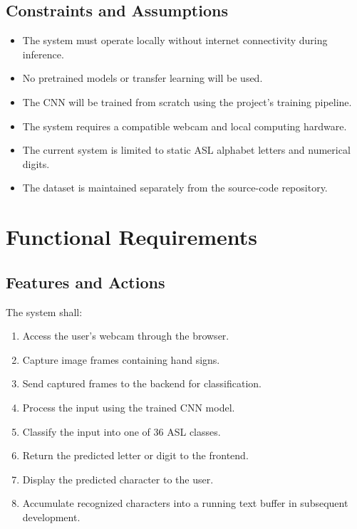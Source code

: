 \documentclass{article}
\begin{document}
\subsection{Constraints and Assumptions}
\begin{itemize}
    \item The system must operate locally without internet connectivity during inference.
    \item No pretrained models or transfer learning will be used.
    \item The CNN will be trained from scratch using the project's training pipeline.
    \item The system requires a compatible webcam and local computing hardware.
    \item The current system is limited to static ASL alphabet letters and numerical digits.
    \item The dataset is maintained separately from the source-code repository.
\end{itemize}


\section{Functional Requirements}

\subsection{Features and Actions}
The system shall:
\begin{enumerate}
    \item Access the user's webcam through the browser.
    \item Capture image frames containing hand signs.
    \item Send captured frames to the backend for classification.
    \item Process the input using the trained CNN model.
    \item Classify the input into one of 36 ASL classes.
    \item Return the predicted letter or digit to the frontend.
    \item Display the predicted character to the user.
    \item Accumulate recognized characters into a running text buffer in subsequent development.
\end{enumerate}
\end{document}
